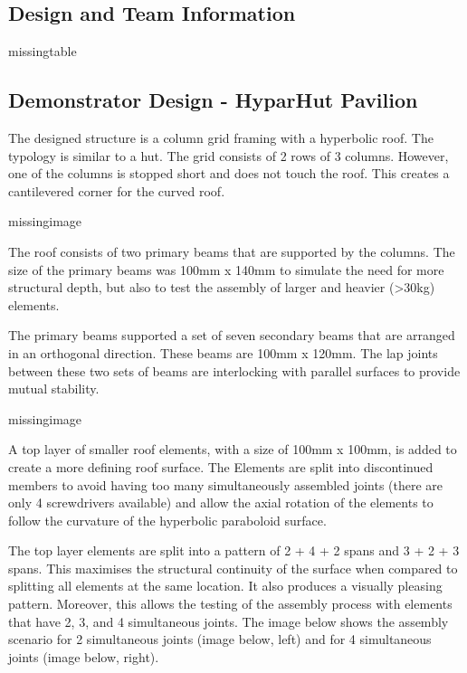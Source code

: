 \subsection{Design and Team Information}
\label{subsection:exploration-4-design-and-team-information}

missingtable

\subsection{Demonstrator Design  - HyparHut Pavilion}
\label{subsection:exploration-4-demonstrator-design-hyparhut-pavilion}

The designed structure is a column grid framing with a hyperbolic roof. The typology is similar to a hut. The grid consists of 2 rows of 3 columns. However, one of the columns is stopped short and does not touch the roof. This creates a cantilevered corner for the curved roof.

missingimage

The roof consists of two primary beams that are supported by the columns. The size of the primary beams was 100mm x 140mm to simulate the need for more structural depth, but also to test the assembly of larger and heavier (>30kg) elements.

The primary beams supported a set of seven secondary beams that are arranged in an orthogonal direction. These beams are 100mm x 120mm. The lap joints between these two sets of beams are interlocking with parallel surfaces to provide mutual stability. 

missingimage

A top layer of smaller roof elements, with a size of 100mm x 100mm, is added to create a more defining roof surface. The Elements are split into discontinued members to avoid having too many simultaneously assembled joints (there are only 4 screwdrivers available) and allow the axial rotation of the elements to follow the curvature of the hyperbolic paraboloid surface. 

The top layer elements are split into a pattern of 2 + 4 + 2 spans and 3 + 2 + 3 spans. This maximises the structural continuity of the surface when compared to splitting all elements at the same location. It also produces a visually pleasing pattern. Moreover, this allows the testing of the assembly process with elements that have 2, 3, and 4 simultaneous joints. The image below shows the assembly scenario for 2 simultaneous joints (image below, left) and for 4 simultaneous joints (image below, right).

